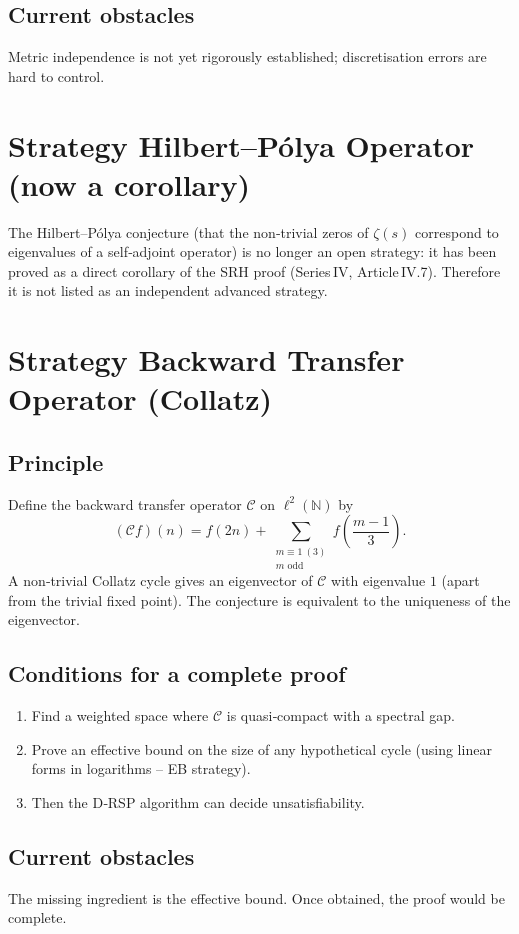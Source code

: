 \documentclass[11pt,a4paper]{article}
\begin{document}
\subsection{Current obstacles}
Metric independence is not yet rigorously established; discretisation errors are hard to control.

\section{Strategy Hilbert–Pólya Operator (now a corollary)}

The Hilbert–Pólya conjecture (that the non‑trivial zeros of \(\zeta(s)\) correspond to eigenvalues of a self‑adjoint operator) is no longer an open strategy: it has been proved as a direct corollary of the SRH proof (Series IV, Article IV.7). Therefore it is not listed as an independent advanced strategy.

\section{Strategy Backward Transfer Operator (Collatz)}

\subsection{Principle}
Define the backward transfer operator \(\mathcal{C}\) on \(\ell^2(\mathbb{N})\) by
\[
(\mathcal{C}f)(n) = f(2n) + \sum_{\substack{m\equiv 1\ (3)\\ m\text{ odd}}} f\!\left(\frac{m-1}{3}\right).
\]
A non‑trivial Collatz cycle gives an eigenvector of \(\mathcal{C}\) with eigenvalue \(1\) (apart from the trivial fixed point). The conjecture is equivalent to the uniqueness of the eigenvector.

\subsection{Conditions for a complete proof}
\begin{enumerate}
\item Find a weighted space where \(\mathcal{C}\) is quasi‑compact with a spectral gap.
\item Prove an effective bound on the size of any hypothetical cycle (using linear forms in logarithms – EB strategy).
\item Then the D‑RSP algorithm can decide unsatisfiability.
\end{enumerate}

\subsection{Current obstacles}
The missing ingredient is the effective bound. Once obtained, the proof would be complete.
\end{document}
